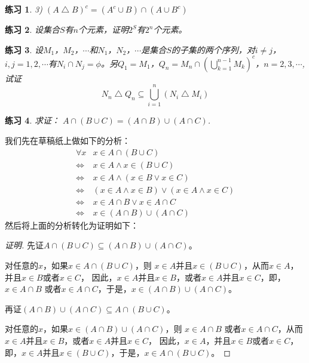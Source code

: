 \documentclass{book}[oneside]
\newtheorem{Exercise}{练习}[chapter]
\begin{document}
\begin{CJK*}{UTF8}{gbsn}
\begin{Exercise}
3) $(A \bigtriangleup B)^c = (A^c \cup B) \cap (A \cup B^c)$
\end{Exercise}
  \begin{Exercise}
    设集合$S$有$n$个元素，证明$2^S$有$2^n$个元素。
  \end{Exercise}
    \begin{Exercise}
    设$M_1$，$M_2$，$\cdots$和$N_1$，$N_2$，$\cdots$是集合$S$的子集的两个序列，对$i \neq j$，$i, j = 1, 2, \cdots$有$N_i\cap N_j=\phi$。另$Q_1 = M_1$，$Q_n = M_n \cap (\bigcup_{k=1}^{n-1}M_k)^c$，$n=2,3,\cdots$, 试证
    \[N_n \bigtriangleup Q_n \subseteq \bigcup_{i=1}^n(N_i\bigtriangleup M_i)\]
  \end{Exercise}
  \begin{Exercise}
    求证： $A \cap (B \cup C) = (A \cap B) \cup (A \cap C)$.
  \end{Exercise}
  我们先在草稿纸上做如下的分析：
  \begin{equation*}
    \begin{split}
      \forall x &x \in A \cap (B \cup C) \\
      \Leftrightarrow& x \in A \land x \in (B \cup C)\\
      \Leftrightarrow& x \in A \land (x \in B \lor x \in C)\\
      \Leftrightarrow& (x \in A \land x \in B) \lor (x \in A \land x \in C)\\
      \Leftrightarrow& x \in A \cap B \lor x \in A \cap C\\
      \Leftrightarrow& x \in (A \cap B) \cup (A \cap C)
    \end{split}
  \end{equation*}
  然后将上面的分析转化为证明如下：  
\begin{proof}[证明]
  先证$A \cap (B \cup C) \subseteq (A \cap B) \cup (A \cap C)$。

  对任意的$x$，如果$x \in A \cap (B \cup C)$，则 $x \in A$并且$x \in (B \cup C)$，从而$x \in A$，并且$x \in B$或者$ x \in C$，
  因此，$x \in A$并且$x \in B$，或者$x \in A$并且$ x \in C$，即，$x \in A \cap B$ 或者$x \in A \cap C$，于是，$x \in (A \cap B) \cup (A \cap C)$。

  再证$(A \cap B) \cup (A \cap C) \subseteq A \cap (B \cup C)$。

    对任意的$x$，如果$x \in (A \cap B) \cup (A \cap C)$，则 $x \in A \cap B$ 或者$x \in A \cap C$，从而$x \in A$并且$x \in B$，或者$x \in A$并且$ x \in C$，
  因此，$x \in A$，并且$x \in B$或者$ x \in C$，即，$x \in A$并且$x \in (B \cup C)$，于是，$x \in A \cap (B \cup C)$。


\end{proof}
\end{CJK*}
\end{document}
